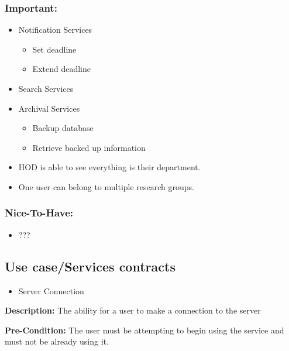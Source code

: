 \documentclass[11pt]{article}
\begin{document}
\begin{itemize}
\begin{itemize}
		\end{itemize}
	\end{itemize}
	
\subsubsection{Important:}	
	\begin{itemize}
		\item Notification Services
		\begin{itemize}
			\item Set deadline
			\item Extend deadline
		\end{itemize}
		\item Search Services
		\item Archival Services
		\begin{itemize}
			\item Backup  database
			\item Retrieve backed up information
		\end{itemize}
	\end{itemize}
	\begin{itemize}
		\item HOD is able to see everything is their department.
	\end{itemize}
	\begin{itemize}
		\item One user can belong to multiple research groups.
	\end{itemize} 
	
\subsubsection{Nice-To-Have:}
	\begin{itemize}
		\item ???
	\end{itemize}

\subsection{Use case/Services contracts}
\begin{itemize}
	\item Server Connection
\end{itemize}

{\raggedright
	\textbf{Description: }The ability for a user to make a connection to the server
}

{\raggedright
	\textbf{Pre-Condition: }The user must be attempting to begin using the service
	and must not be already using it.
}
\end{document}
